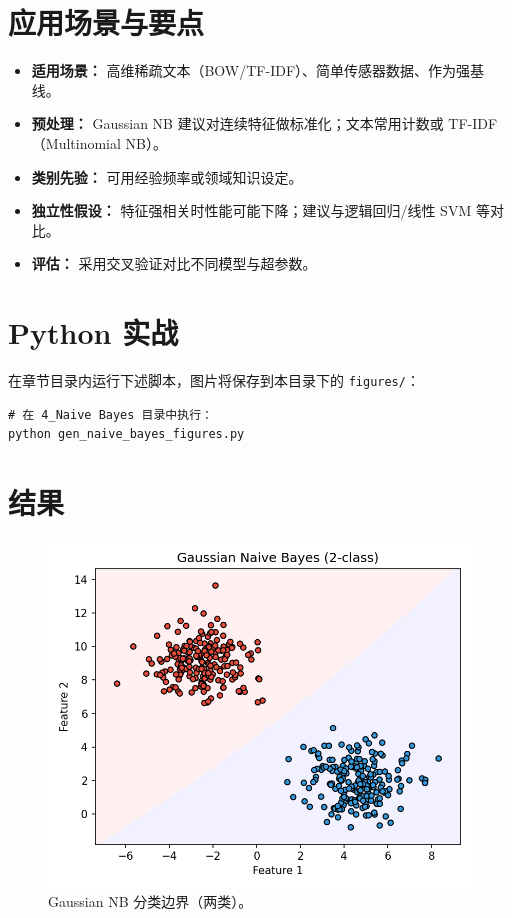 \documentclass[UTF8,zihao=-4]{ctexart}
\begin{document}
\section{应用场景与要点}
\begin{itemize}
  \item \textbf{适用场景：} 高维稀疏文本（BOW/TF-IDF）、简单传感器数据、作为强基线。
  \item \textbf{预处理：} Gaussian NB 建议对连续特征做标准化；文本常用计数或 TF-IDF（Multinomial NB）。
  \item \textbf{类别先验：} 可用经验频率或领域知识设定。
  \item \textbf{独立性假设：} 特征强相关时性能可能下降；建议与逻辑回归/线性 SVM 等对比。
  \item \textbf{评估：} 采用交叉验证对比不同模型与超参数。
\end{itemize}

\section{Python 实战}
在章节目录内运行下述脚本，图片将保存到本目录下的 \texttt{figures/}：
\begin{lstlisting}[style=code,caption={生成朴素贝叶斯配图},label={lst:genfigs_cn}]
# 在 4_Naive Bayes 目录中执行：
python gen_naive_bayes_figures.py
\end{lstlisting}



\section{结果}
\begin{figure}[H]
  \centering
  \includegraphics[width=0.9\linewidth]{gnb_decision_boundary_2class.png}
  \caption{Gaussian NB 分类边界（两类）。}
  \label{fig:gnb2_cn}
\end{figure}
\FloatBarrier
\end{document}
